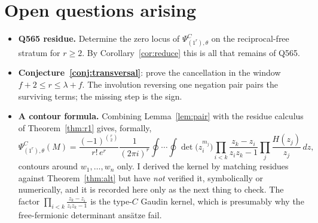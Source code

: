 \documentclass[11pt]{article}
\theoremstyle{definition}
\theoremstyle{remark}
\newcommand{\PsiC}{\Psi^{C}}
\begin{document}
\section{Open questions arising}

\begin{itemize}
\item \textbf{Q565 residue.} Determine the zero locus of
  $\PsiC_{(1^r),\theta}$ on the reciprocal-free stratum for $r\ge2$. By
  Corollary~\ref{cor:reduce} this is all that remains of Q565.
\item \textbf{Conjecture~\ref{conj:transversal}}: prove the cancellation in the
  window $f+2\le r\le\lambda+f$. The involution reversing one negation pair pairs
  the surviving terms; the missing step is the sign.
\item \textbf{A contour formula.} Combining Lemma~\ref{lem:pair} with the residue
  calculus of Theorem~\ref{thm:r1} gives, formally,
  \[
    \PsiC_{(1^r),\theta}(M)=\frac{(-1)^{\binom r2}}{r!\,e^{r}}
    \frac{1}{(2\pi i)^r}\oint\!\cdots\!\oint
      \det\bigl(z_i^{m_j}\bigr)
      \prod_{i<k}\frac{z_k-z_i}{z_iz_k-1}
      \prod_{j}\frac{H(z_j)}{z_j}\,dz,
  \]
  contours around $w_1,\dots,w_n$ only. I derived the kernel by matching residues
  against Theorem~\ref{thm:alt} but have \emph{not} verified it, symbolically or
  numerically, and it is recorded here only as the next thing to check. The factor
  $\prod_{i<k}\frac{z_k-z_i}{z_iz_k-1}$ is the type-$C$ Gaudin kernel, which is
  presumably why the free-fermionic determinant ansätze fail.
\end{itemize}
\end{document}
